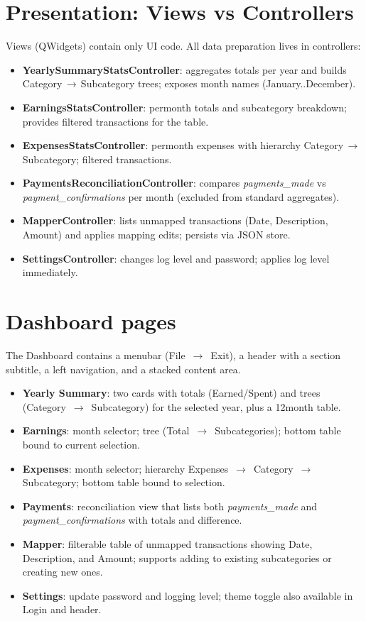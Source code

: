 \documentclass[11pt,a4paper]{report}
\begin{document}
\section{Presentation: Views vs Controllers}
Views (QWidgets) contain only UI code. All data preparation lives in controllers:
\begin{itemize}[leftmargin=*]
  \item \textbf{YearlySummaryStatsController}: aggregates totals per year and builds Category\,$\rightarrow$\,Sub\-category trees; exposes month names (January..December).
  \item \textbf{EarningsStatsController}: per\-month totals and sub\-category breakdown; provides filtered transactions for the table.
  \item \textbf{ExpensesStatsController}: per\-month expenses with hierarchy Category\,$\rightarrow$\,Sub\-category; filtered transactions.
  \item \textbf{PaymentsReconciliationController}: compares \emph{payments\_made} vs \emph{payment\_confirmations} per month (excluded from standard aggregates).
  \item \textbf{MapperController}: lists unmapped transactions (Date, Description, Amount) and applies mapping edits; persists via JSON store.
  \item \textbf{SettingsController}: changes log level and password; applies log level immediately.
\end{itemize}

\section{Dashboard pages}
The Dashboard contains a menubar (File \,$\rightarrow$\, Exit), a header with a section subtitle, a left navigation, and a stacked content area.
\begin{itemize}[leftmargin=*]
  \item \textbf{Yearly Summary}: two cards with totals (Earned/Spent) and trees (Category \,$\rightarrow$\, Sub\-category) for the selected year, plus a 12\-month table.
  \item \textbf{Earnings}: month selector; tree (Total \,$\rightarrow$\, Sub\-categories); bottom table bound to current selection.
  \item \textbf{Expenses}: month selector; hierarchy Expenses \,$\rightarrow$\, Category \,$\rightarrow$\, Sub\-category; bottom table bound to selection.
  \item \textbf{Payments}: reconciliation view that lists both \emph{payments\_made} and \emph{payment\_confirmations} with totals and difference.
  \item \textbf{Mapper}: filterable table of unmapped transactions showing Date, Description, and Amount; supports adding to existing sub\-categories or creating new ones.
  \item \textbf{Settings}: update password and logging level; theme toggle also available in Login and header.
\end{itemize}
\end{document}
